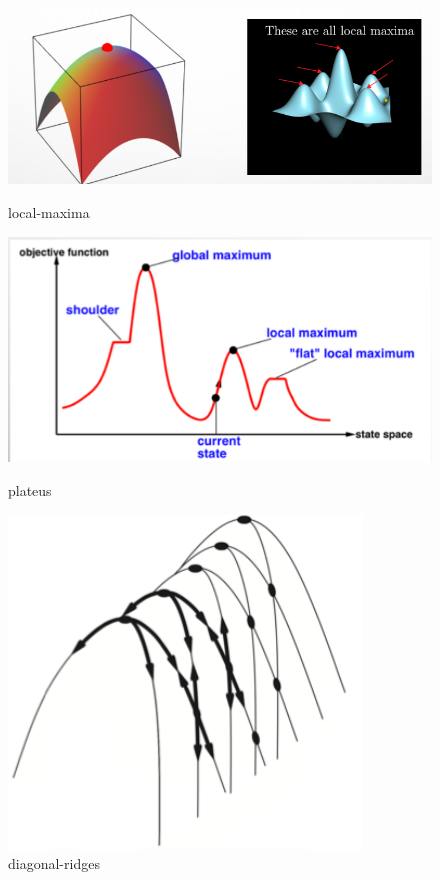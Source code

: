 \begin{figure}[H]
    \minipage{\textwidth}
    \includegraphics[width=\linewidth]{source/local-maxima.png}
    \caption{local-maxima}
    \label{fig:local-maxima}
    \endminipage\hfill
    \includegraphics[width=\linewidth]{source/plateus.png}
    \caption{plateus}
    \label{fig:plateus}
    \endminipage\hfill
    \includegraphics[width=\linewidth]{source/diagonal-ridges.png}
    \caption{diagonal-ridges}
    \label{fig:diagonal-ridges}
    \endminipage\hfill
\end{figure}

